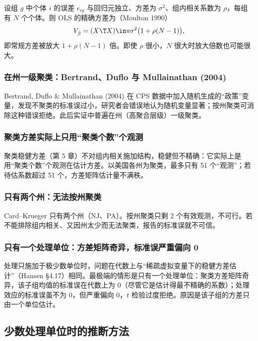 设组 $g$ 中个体 $i$ 的误差 $e_{ig}$ 与回归元独立、方差为 $\sigma^2$、组内相关系数为 $\rho$，每组有 $N$ 个个体。则 OLS 的精确方差为（Moulton 1990）
\[
V_{\hat\beta}=(X\T X)\inv\sigma^2\bigl(1+\rho(N-1)\bigr),
\]
即常规方差被放大 $1+\rho(N-1)$ 倍。即使 $\rho$ 很小，$N$ 很大时放大倍数也可能很大。

\subsubsection{在州一级聚类：Bertrand、Duflo 与 Mullainathan (2004)}

Bertrand, Duflo \& Mullainathan (2004) 在 CPS 数据中加入随机生成的“政策”变量，发现不聚类的标准误过小，研究者会错误地认为随机变量显著；按州聚类可消除这种错误拒绝。此后实证中普遍在州（高聚合层级）一级聚类。

\subsubsection{聚类方差实际上只用“聚类个数”个观测}

聚类稳健方差（第 5 章）不对组内相关施加结构，稳健但不精确：它实际上是用“聚类个数”个观测在估计方差。以美国各州为聚类，最多只有 51 个“观测”；若待估系数超过 51 个，方差矩阵估计量不满秩。

\subsubsection{只有两个州：无法按州聚类}

Card--Krueger 只有两个州（NJ、PA）。按州聚类只剩 2 个有效观测，不可行。若不能排除组内相关、又因州太少而无法聚类，报告的标准误就不可信。

\subsubsection{只有一个处理单位：方差矩阵奇异，标准误严重偏向 0}

处理只施加于极少数单位时，问题在代数上与“稀疏虚拟变量下的稳健方差估计”（Hansen §4.17）相同。最极端的情形是只有一个处理单位：聚类方差矩阵奇异，该子组均值的标准误在代数上为 0（尽管它是估计得最不精确的系数）；处理效应的标准误虽不为 0，但严重偏向 0，$t$ 检验过度拒绝。原因是该子组的方差只由一个单位估计。

\subsection{少数处理单位时的推断方法}

